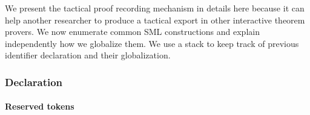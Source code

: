 \documentclass[runningheads,a4paper,draft]{svjour3}
\def\sml{\textsf{SML}\xspace}
\begin{document}
%




%
%



We present the tactical proof recording mechanism in details here because it 
can help 
another researcher to produce a tactical export in other interactive theorem 
provers.
We now enumerate common \sml constructions and explain 
independently how we globalize them. We use a stack to keep track of previous 
identifier declaration and their globalization.






\subsubsection{Declaration}

\paragraph{Reserved tokens}
\end{document}

